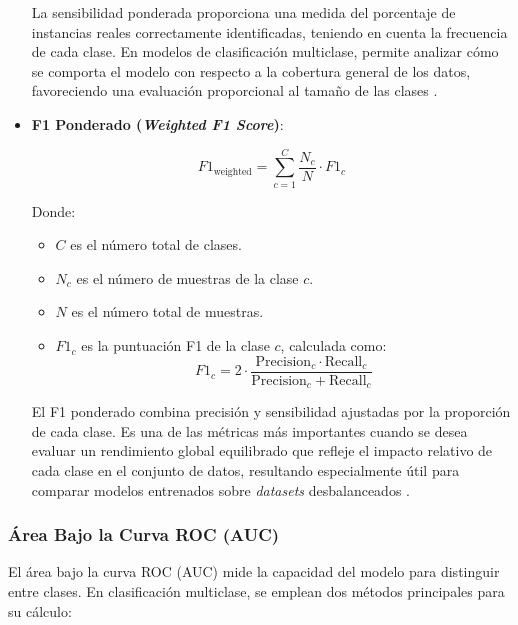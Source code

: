 \begin{itemize}
La sensibilidad ponderada proporciona una medida del porcentaje de instancias reales correctamente identificadas, teniendo en cuenta la frecuencia de cada clase. En modelos de clasificación multiclase, permite analizar cómo se comporta el modelo con respecto a la cobertura general de los datos, favoreciendo una evaluación proporcional al tamaño de las clases \cite{Japkowicz2000}.

\item \textbf{F1 Ponderado (\textit{Weighted F1 Score})}:

\begin{equation}
F1_{\text{weighted}} = \sum_{c=1}^{C} \frac{N_c}{N} \cdot F1_c
\end{equation}

Donde:
\begin{itemize}
    \item \( C \) es el número total de clases.
    \item \( N_c \) es el número de muestras de la clase \( c \).
    \item \( N \) es el número total de muestras.
    \item \( F1_c \) es la puntuación F1 de la clase \( c \), calculada como:
    \[
    F1_c = 2 \cdot \frac{\text{Precision}_c \cdot \text{Recall}_c}{\text{Precision}_c + \text{Recall}_c}
    \]
\end{itemize}

El F1 ponderado combina precisión y sensibilidad ajustadas por la proporción de cada clase. Es una de las métricas más importantes cuando se desea evaluar un rendimiento global equilibrado que refleje el impacto relativo de cada clase en el conjunto de datos, resultando especialmente útil para comparar modelos entrenados sobre \textit{datasets} desbalanceados \cite{Liu2011}.

\end{itemize}

\subsubsection*{Área Bajo la Curva ROC (AUC)}

El área bajo la curva ROC (AUC) mide la capacidad del modelo para distinguir entre clases. En clasificación multiclase, se emplean dos métodos principales para su cálculo:

